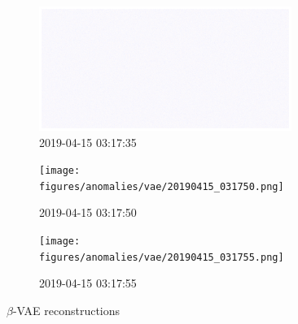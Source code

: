 \clearpage
\begin{figure}[p]
\centering
\begin{subfigure}{\textwidth}
    \centering
    \includegraphics[width=0.9\textwidth]{figures/anomalies/vae/20190415_031735.png}
    \caption{2019-04-15 03:17:35}
\end{subfigure}
\vspace{1em}
\begin{subfigure}{\textwidth}
    \centering
    \texttt{[image: figures/anomalies/vae/20190415\_031750.png]}
    \caption{2019-04-15 03:17:50}
\end{subfigure}
\vspace{1em}
\begin{subfigure}{\textwidth}
    \centering
    \texttt{[image: figures/anomalies/vae/20190415\_031755.png]}
    \caption{2019-04-15 03:17:55}
\end{subfigure}
\caption{$\beta$-VAE reconstructions}
\label{fig:beta_vae_reconstructions}
\end{figure}
\clearpage
